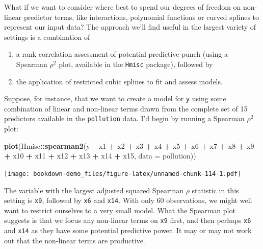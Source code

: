 \documentclass[]{book}
\newenvironment{Shaded}{\begin{snugshade}}{\end{snugshade}}
\newcommand{\KeywordTok}[1]{\textcolor[rgb]{0.13,0.29,0.53}{\textbf{#1}}}
\newcommand{\DataTypeTok}[1]{\textcolor[rgb]{0.13,0.29,0.53}{#1}}
\newcommand{\StringTok}[1]{\textcolor[rgb]{0.31,0.60,0.02}{#1}}
\newcommand{\OperatorTok}[1]{\textcolor[rgb]{0.81,0.36,0.00}{\textbf{#1}}}
\newcommand{\NormalTok}[1]{#1}
\providecommand{\tightlist}{%
  \setlength{\itemsep}{0pt}\setlength{\parskip}{0pt}}
\theoremstyle{definition}
\theoremstyle{definition}
\theoremstyle{definition}
\theoremstyle{remark}
\begin{document}
What if we want to consider where best to spend our degrees of freedom
on non-linear predictor terms, like interactions, polynomial functions
or curved splines to represent our input data? The approach we'll find
useful in the largest variety of settings is a combination of

\begin{enumerate}
\def\labelenumi{\arabic{enumi}.}
\tightlist
\item
  a rank correlation assessment of potential predictive punch (using a
  Spearman \(\rho^2\) plot, available in the \texttt{Hmisc} package),
  followed by
\item
  the application of restricted cubic splines to fit and assess models.
\end{enumerate}

Suppose, for instance, that we want to create a model for \texttt{y}
using some combination of linear and non-linear terms drawn from the
complete set of 15 predictors available in the \texttt{pollution} data.
I'd begin by running a Spearman \(\rho^2\) plot:

\begin{Shaded}
\begin{Highlighting}[]
\KeywordTok{plot}\NormalTok{(Hmisc}\OperatorTok{::}\KeywordTok{spearman2}\NormalTok{(y }\OperatorTok{~}\StringTok{ }\NormalTok{x1 }\OperatorTok{+}\StringTok{ }\NormalTok{x2 }\OperatorTok{+}\StringTok{ }\NormalTok{x3 }\OperatorTok{+}\StringTok{ }\NormalTok{x4 }\OperatorTok{+}\StringTok{ }\NormalTok{x5 }\OperatorTok{+}\StringTok{ }\NormalTok{x6 }\OperatorTok{+}\StringTok{ }\NormalTok{x7 }\OperatorTok{+}
\StringTok{                          }\NormalTok{x8 }\OperatorTok{+}\StringTok{ }\NormalTok{x9 }\OperatorTok{+}\StringTok{ }\NormalTok{x10 }\OperatorTok{+}\StringTok{ }\NormalTok{x11 }\OperatorTok{+}\StringTok{ }\NormalTok{x12 }\OperatorTok{+}\StringTok{ }\NormalTok{x13 }\OperatorTok{+}
\StringTok{                          }\NormalTok{x14 }\OperatorTok{+}\StringTok{ }\NormalTok{x15, }\DataTypeTok{data =}\NormalTok{ pollution))}
\end{Highlighting}
\end{Shaded}

\texttt{[image: bookdown-demo\_files/figure-latex/unnamed-chunk-114-1.pdf]}

The variable with the largest adjusted squared Spearman \(\rho\)
statistic in this setting is \texttt{x9}, followed by \texttt{x6} and
\texttt{x14}. With only 60 observations, we might well want to restrict
ourselves to a very small model. What the Spearman plot suggests is that
we focus any non-linear terms on \texttt{x9} first, and then perhaps
\texttt{x6} and \texttt{x14} as they have some potential predictive
power. It may or may not work out that the non-linear terms are
productive.
\end{document}
